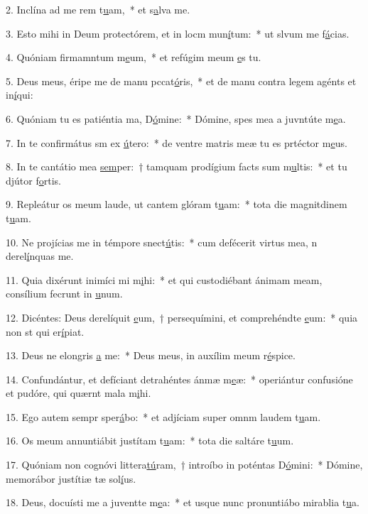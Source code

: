 2. Inclína ad me rem t\uline{u}am,~* et s\uline{a}lva me.\par 
3. Esto mihi in Deum protectórem, et in locm mun\uline{í}tum:~* ut slvum me f\uline{á}cias.\par 
4. Quóniam firmamntum m\uline{e}um,~* et refúgim meum \uline{e}s tu.\par 
5. Deus meus, éripe me de manu pccat\uline{ó}ris,~* et de manu contra legem agénts et in\uline{í}qui:\par 
6. Quóniam tu es patiéntia ma, D\uline{ó}mine:~* Dómine, spes mea a juvntúte m\uline{e}a.\par 
7. In te confirmátus sm ex \uline{ú}tero:~* de ventre matris meæ tu es prtéctor m\uline{e}us.\par 
8. In te cantátio mea \uline{sem}per:~† tamquam prodígium facts sum m\uline{u}ltis:~* et tu djútor f\uline{o}rtis.\par 
9. Repleátur os meum laude, ut cantem glóram t\uline{u}am:~* tota die magnitdinem t\uline{u}am.\par 
10. Ne projícias me in témpore snect\uline{ú}tis:~* cum defécerit virtus mea, n derel\uline{í}nquas me.\par 
11. Quia dixérunt inimíci mi m\uline{i}hi:~* et qui custodiébant ánimam meam, consílium fecrunt in \uline{u}num.\par 
12. Dicéntes: Deus derelíquit \uline{e}um,~† persequímini, et comprehéndte \uline{e}um:~* quia non st qui er\uline{í}piat.\par 
13. Deus ne elongris \uline{a} me:~* Deus meus, in auxílim meum r\uline{é}spice.\par 
14. Confundántur, et defíciant detrahéntes ánmæ m\uline{e}æ:~* operiántur confusióne et pudóre, qui quærnt mala m\uline{i}hi.\par 
15. Ego autem sempr sper\uline{á}bo:~* et adjíciam super omnm laudem t\uline{u}am.\par 
16. Os meum annuntiábit justítam t\uline{u}am:~* tota die saltáre t\uline{u}um.\par 
17. Quóniam non cognóvi littera\uline{tú}ram,~† introíbo in poténtas D\uline{ó}mini:~* Dómine, memorábor justítiæ tæ sol\uline{í}us.\par 
18. Deus, docuísti me a juventte m\uline{e}a:~* et usque nunc pronuntiábo mirablia t\uline{u}a.\par 

